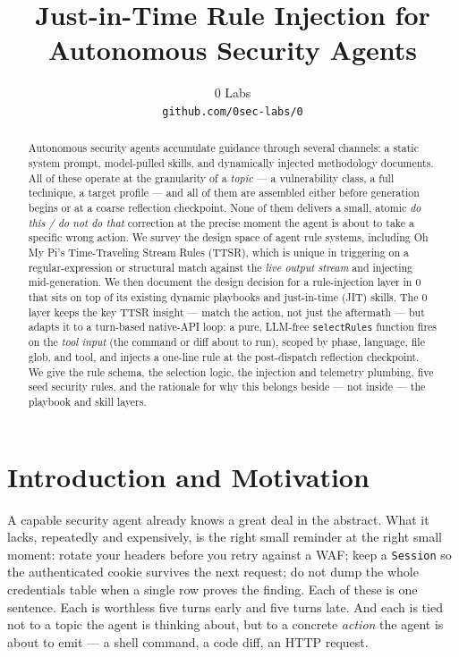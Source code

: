 \documentclass[11pt]{article}
\title{Just-in-Time Rule Injection for Autonomous Security Agents}
\author{
  0 Labs \\
  \texttt{github.com/0sec-labs/0}
}
\date{}
\begin{document}
\maketitle

\begin{abstract}
Autonomous security agents accumulate guidance through several channels: a
static system prompt, model-pulled skills, and dynamically injected
methodology documents. All of these operate at the granularity of a
\emph{topic} --- a vulnerability class, a full technique, a target profile ---
and all of them are assembled either before generation begins or at a
coarse reflection checkpoint. None of them delivers a small, atomic
\emph{do this / do not do that} correction at the precise moment the agent is
about to take a specific wrong action. We survey the design space of
agent rule systems, including Oh My Pi's Time-Traveling Stream Rules (TTSR),
which is unique in triggering on a regular-expression or structural match
against the \emph{live output stream} and injecting mid-generation. We then
document the design decision for a rule-injection layer in 0 that sits on
top of its existing dynamic playbooks and just-in-time (JIT) skills. The 0
layer keeps the key TTSR insight --- match the action, not just the aftermath
--- but adapts it to a turn-based native-API loop: a pure, LLM-free
\texttt{selectRules} function fires on the \emph{tool input} (the command or
diff about to run), scoped by phase, language, file glob, and tool, and injects
a one-line rule at the post-dispatch reflection checkpoint. We give the rule
schema, the selection logic, the injection and telemetry plumbing, five seed
security rules, and the rationale for why this belongs beside --- not inside ---
the playbook and skill layers.
\end{abstract}

\section{Introduction and Motivation}

A capable security agent already knows a great deal in the abstract. What it
lacks, repeatedly and expensively, is the right small reminder at the right
small moment: rotate your headers before you retry against a WAF; keep a
\texttt{Session} so the authenticated cookie survives the next request; do not
dump the whole credentials table when a single row proves the finding. Each of
these is one sentence. Each is worthless five turns early and five turns late.
And each is tied not to a topic the agent is thinking about, but to a concrete
\emph{action} the agent is about to emit --- a shell command, a code diff, an
HTTP request.
\end{document}
